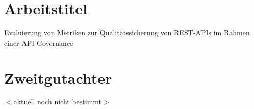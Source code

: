 \documentclass[../../expose]{subfiles}
\begin{document}
\section {Arbeitstitel}
Evaluierung von Metriken zur Qualitätssicherung von REST-APIs im Rahmen einer API-Governance

\section {Zweitgutachter}
$<$aktuell noch nicht bestimmt$>$
\end{document}
